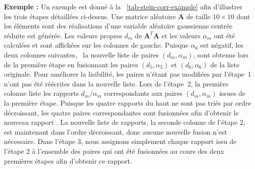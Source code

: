     \bigskip\noindent%
    \textbf{Exemple :} Un exemple est donné à la \tabname~\ref{tab-stein-corr-example} afin d'illustrer les trois étapes détaillées ci-dessus. Une matrice aléatoire $\mathbf{A}$ de taille $10\times 10$ dont les éléments sont des réalisations d'une variable aléatoire gaussienne centrée réduite est générée. Les valeurs propres $d_m$ de $\mathbf{A}^T\mathbf{A}$ et les valeurs $\alpha_m$ ont été calculées et sont affichées sur les colonnes de gauche. Puisque $\alpha_6$ est négatif, les deux colonnes suivantes, \ie\ la nouvelle liste de paires $(d_m, \alpha_m)$, sont obtenus lors de la première étape en fusionnant les paires $(d_5, \alpha_5)$ et $(d_6,\alpha_6)$ de la liste originale. Pour améliorer la lisibilité, les paires n'étant pas modifiées par l'étape~1 n'ont pas été réécrites dans la nouvelle liste. Lors de l'étape~2, la première colonne liste les rapports $d_m/\alpha_m$ correspondants aux paires $(d_m, \alpha_m)$ issues de la première étape. Puisque les quatre rapports du haut ne sont pas triés par ordre décroissant, les quatre paires correspondantes sont fusionnées afin d'obtenir le nouveau rapport . La nouvelle liste de rapports, \ie{} la seconde colonne de l'étape 2, est maintenant dans l'ordre décroissant, donc aucune nouvelle fusion n'est nécessaire. Dans l'étape 3, nous assignons simplement chaque rapport issu de l'étape 2 à l'ensemble des paires qui ont été fusionnées au cours des deux premières étapes afin d'obtenir ce rapport.
    
    
    
